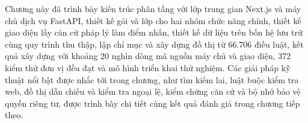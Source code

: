 \documentclass[../DoAn.tex]{subfiles}
\begin{document}
Chương này đã trình bày kiến trúc phân tầng với lớp trung gian Next.js và máy chủ dịch vụ FastAPI, thiết kế gói và lớp cho hai nhóm chức năng chính, thiết kế giao diện lấy căn cứ pháp lý làm điểm nhấn, thiết kế dữ liệu trên bốn hệ lưu trữ cùng quy trình thu thập, lập chỉ mục và xây dựng đồ thị từ 66.706 điều luật, kết quả xây dựng với khoảng 20 nghìn dòng mã nguồn máy chủ và giao diện, 372 kiểm thử đơn vị đều đạt và mô hình triển khai thử nghiệm. Các giải pháp kỹ thuật nổi bật được nhắc tới trong chương, như tìm kiếm lai, luật buộc kiểm tra web, đồ thị dẫn chiếu và kiểm tra ngoại lệ, kiểm chứng căn cứ và bộ nhớ bảo vệ quyền riêng tư, được trình bày chi tiết cùng kết quả đánh giá trong chương tiếp theo.
\end{document}
